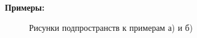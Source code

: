 \noindent\textbf{Примеры:}
\begin{figure}[h]
	\begin{minipage}[h]{0.49\linewidth}
	\end{minipage}
	\hfill
	\begin{minipage}[h]{0.49\linewidth}
	\end{minipage}
	\caption{Рисунки подпространств к примерам а) и б)}
	\label{ris:image1}
\end{figure}

